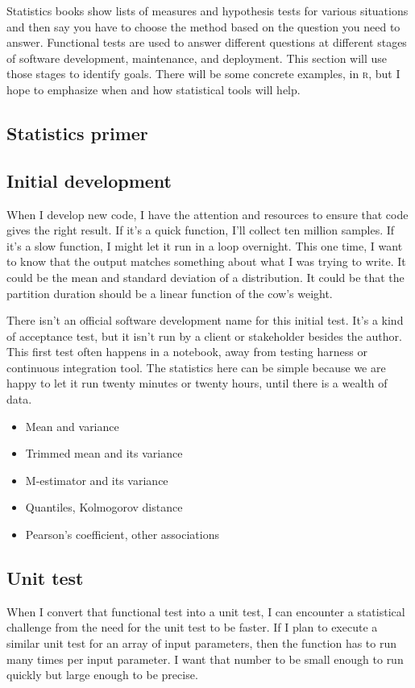 \documentclass[fleqn,10pt]{olplainarticle}
\newcommand{\rlang}{\textsc{r}\xspace}
\begin{document}
Statistics books show lists of measures and hypothesis tests
for various situations and then say you have to choose the
method based on the question you need to answer. Functional tests
are used to answer different questions at different stages
of software development, maintenance, and deployment. This section
will use those stages to identify goals. There will be some
concrete examples, in \rlang, but I hope to emphasize when
and how statistical tools will help.

\subsection{Statistics primer}

\subsection{Initial development}

When I develop new code, I have the attention and resources to ensure
that code gives the right result. If it's a quick function, I'll collect
ten million samples. If it's a slow function, I might let it run in a loop
overnight. This one time, I want to know that the output matches
something about what I was trying to write. It could be the mean and
standard deviation of a distribution. It could be that the partition
duration should be a linear function of the cow's weight.

There isn't an official software development name for this initial test.
It's a kind of acceptance test, but it isn't run by a client or stakeholder
besides the author. This first test often happens in a notebook, away from
testing harness or continuous integration tool.
The statistics here can be simple because we are happy
to let it run twenty minutes or twenty hours, until there is a wealth
of data.

\begin{itemize}
    \item Mean and variance
    \item Trimmed mean and its variance
    \item M-estimator and its variance
    \item Quantiles, Kolmogorov distance
    \item Pearson's coefficient, other associations
\end{itemize}


\subsection{Unit test}
When I convert that functional test into a unit test, I can encounter
a statistical challenge from the need for the unit test to be faster.
If I plan to execute a similar unit test for an array of input parameters,
then the function has to run many times per input parameter. I want that
number to be small enough to run quickly but large enough to be precise.
\end{document}
